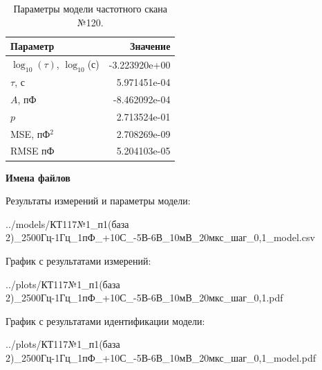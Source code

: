 \begin{table}[!ht]
    \centering
    \caption{Параметры модели частотного скана №120.}
    \begin{tabular}{|l|r|}
        \hline
        Параметр                                       & Значение                  \\ \hline
        $\log_{10}(\tau)$, $\log_{10}$(с)              & -3.223920e+00             \\ \hline
        $\tau$, с                                      & 5.971451e-04              \\ \hline
        $A$, пФ                                        & -8.462092e-04             \\ \hline
        $p$                                            & 2.713524e-01              \\ \hline
        MSE, пФ$^2$                                    & 2.708269e-09              \\ \hline
        RMSE пФ                                        & 5.204103e-05              \\ \hline
    \end{tabular}
    \label{table:frequency_scan_model_120}
\end{table}

\textbf{Имена файлов}

Результаты измерений и параметры модели:

\scriptsize../models/КТ117№1\_п1(база 2)\_2500Гц-1Гц\_1пФ\_+10С\_-5В-6В\_10мВ\_20мкс\_шаг\_0,1\_model.csv
\normalsize

График с результатами измерений:

\scriptsize../plots/КТ117№1\_п1(база 2)\_2500Гц-1Гц\_1пФ\_+10С\_-5В-6В\_10мВ\_20мкс\_шаг\_0,1.pdf
\normalsize

График с результатами идентификации модели:

\scriptsize../plots/КТ117№1\_п1(база 2)\_2500Гц-1Гц\_1пФ\_+10С\_-5В-6В\_10мВ\_20мкс\_шаг\_0,1\_model.pdf
\normalsize

